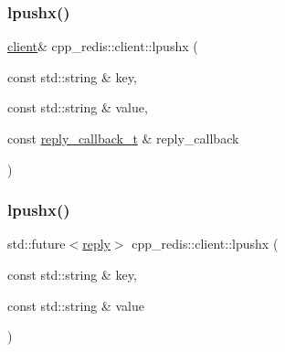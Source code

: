 \mbox{\label{classcpp__redis_1_1client_ab0a9a2b92f53f774ce4e345b42a403d0}} 
\subsubsection{\texorpdfstring{lpushx()}{lpushx()}\hspace{0.1cm}{\footnotesize\ttfamily [1/2]}}
{\footnotesize\ttfamily \hyperlink{classcpp__redis_1_1client}{client}\& cpp\+\_\+redis\+::client\+::lpushx (\begin{DoxyParamCaption}\item[{const std\+::string \&}]{key,  }\item[{const std\+::string \&}]{value,  }\item[{const \hyperlink{classcpp__redis_1_1client_a061a1140d36d2eaeda82b09a0bb3f9f2}{reply\+\_\+callback\+\_\+t} \&}]{reply\+\_\+callback }\end{DoxyParamCaption})}

\mbox{\label{classcpp__redis_1_1client_af9a3e05f5bd6d4ebb3138dc09f8d0d4e}} 
\subsubsection{\texorpdfstring{lpushx()}{lpushx()}\hspace{0.1cm}{\footnotesize\ttfamily [2/2]}}
{\footnotesize\ttfamily std\+::future$<$\hyperlink{classcpp__redis_1_1reply}{reply}$>$ cpp\+\_\+redis\+::client\+::lpushx (\begin{DoxyParamCaption}\item[{const std\+::string \&}]{key,  }\item[{const std\+::string \&}]{value }\end{DoxyParamCaption})}

\mbox{\label{classcpp__redis_1_1client_a9e85cce8555274f7bc706a13911b4579}} 
